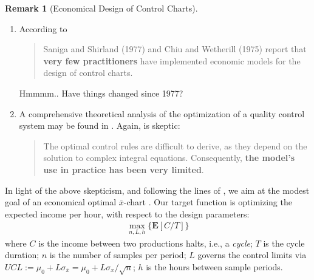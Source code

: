 \documentclass[12pt,a4paper]{report}
\theoremstyle{plain}
\theoremstyle{definition}
\newtheorem{remark}{Remark}
\newcommand{\set}[1]{\{ #1 \}} \newcommand{\setII}[1]{\left\{ #1 \right\}} \newcommand{\rv}[1]{\mathbf{#1}} \newcommand{\x}{\rv x} \newcommand{\y}{\rv y} \newcommand{\U}{\rv u} \newcommand{\T}{\rv t} \newcommand{\X}{\rv X} \newcommand{\Y}{\rv Y} \newcommand{\expect}[1]{\mathbf{E}\left[ #1 \right]} \newcommand{\expectg}[2]{\mathbf{E}_{\rv{#1}}\left[ \rv{#2} \right]} \newcommand{\expectn}[1]{\mathbb{E}\left[#1\right]} \newcommand{\cov}[1]{\mathbf{Cov} \left[ #1 \right]} \newcommand{\var}[1]{\mathop{Var} \left[ #1 \right]} \newcommand{\covn}[1]{\mathbb{Cov} \left[ #1 \right]} \newcommand{\gauss}[1]{\mathcal{N}\left(#1\right)} \newcommand{\cdf}[2]{F_{#1} (#2)} \newcommand{\survive}[2]{S_{#1} (#2)} \newcommand{\hazard}[2]{h_{#1} (#2)} \newcommand{\cuhazard}[2]{H_{#1} (#2)} \newcommand{\cdfn}[2]{\mathbb{F}_{#1}(#2)} \newcommand{\icdf}[2]{F_\rv{#1}^{-1} (#2)} \newcommand{\icdfn}[2]{\mathbb{F}^{-1}_{#1}(#2)} \newcommand{\pdf}[2]{p_{#1} (#2)} \newcommand{\prob}[1]{P\left( #1 \right)} \newcommand{\dist}{P} \newcommand{\density}{p}
\newcommand{\barxChart}{$\bar{x}$-chart }
\newcommand{\arm}{L}
\begin{document}
\begin{remark}[Economical Design of Control Charts]
\noindent
\begin{enumerate}
\item According to \cite{montgomery_introduction_2007} 
\begin{quote}
Saniga and Shirland (1977) and Chiu and Wetherill (1975) report that \textbf{very few practitioners} have implemented economic models for the design of control charts.
\end{quote}
Hmmmm.. Have things changed since 1977?
\item A comprehensive theoretical analysis of the optimization of a quality control system may be found in \cite{girshick_bayes_1952}. Again, \cite{montgomery_introduction_2007} is skeptic:
\begin{quote}
The optimal control rules are difficult to derive, as they depend on the solution to complex integral equations. Consequently, \textbf{the model’s use in practice has been very limited}.
\end{quote}
\end{enumerate}
\end{remark}

In light of the above skepticism, and following the lines of \cite{duncan_economic_1956}, we aim at the modest goal of an economical optimal \barxChart. 
Our target function is optimizing the expected income per hour, with respect to the design parameters:
\begin{align}
\label{eq:optimal_design}
	\max_{n,\arm,h}\set{\expect{C/T}}
\end{align}
where $C$ is the income between two productions halts, i.e., a \emph{cycle};
$T$ is the cycle duration;
$n$ is the number of samples per period;
$\arm$ governs the control limits via $UCL:= \mu_0+ \arm \sigma_{\bar{x}}= \mu_0+ \arm \sigma_x / \sqrt{n}$;
$h$ is the hours between sample periods. 
\end{document}
